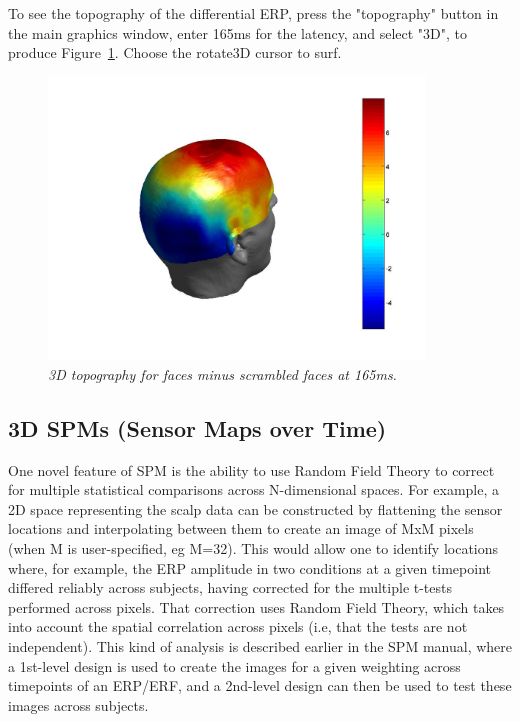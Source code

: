 To see the topography of the differential ERP, press the "topography" button in the main graphics window, enter 165ms for the latency, and select "3D", to produce Figure~\ref{fig_32_5}. Choose the rotate3D cursor to surf.

\begin{figure}
\begin{center}
\includegraphics[width=100mm]{multimodal/figures/figure_32_5}
\caption{\em 3D topography for faces minus scrambled faces at 165ms. \label{fig_32_5}}
\end{center}
\end{figure}


\subsection{3D SPMs (Sensor Maps over Time) \label{3DSPM}}

One novel feature of SPM is the ability to use Random Field Theory to correct for multiple statistical comparisons across N-dimensional spaces. For example, a 2D space representing the scalp data can be constructed by flattening the sensor locations and interpolating between them to create an image of MxM pixels (when M is user-specified, eg M=32). This would allow one to identify locations where, for example, the ERP amplitude in two conditions at a given timepoint differed reliably across subjects, having corrected for the multiple t-tests performed across pixels. That correction uses Random Field Theory, which takes into account the spatial correlation across pixels (i.e, that the tests are not independent). This kind of analysis is described earlier in the SPM manual, where a 1st-level design is used to create the images for a given weighting across timepoints of an ERP/ERF, and a 2nd-level design can then be used to test these images across subjects.

